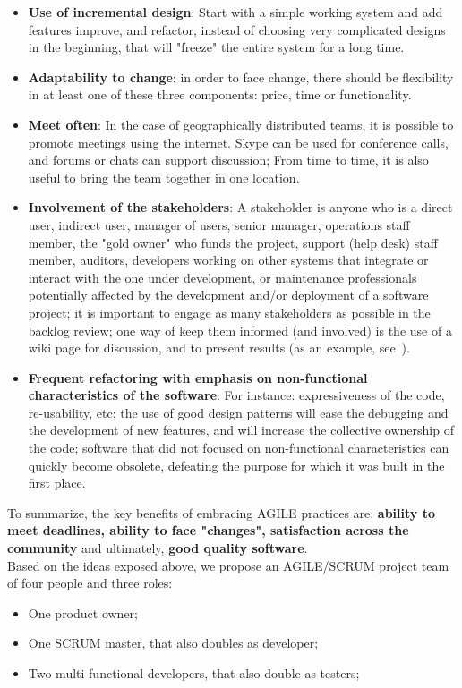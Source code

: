 \documentclass[11pt]{article} %
\begin{document}
\begin{itemize}
\item \textbf{Use of incremental design}: Start with a simple working system and add features improve, and refactor, instead of choosing very complicated designs in the beginning, that will "freeze" the entire system for a long time.
\item \textbf{Adaptability to change}: in order to face change, there should be flexibility in at least one of these three components: price, time or functionality.
\item \textbf{Meet often}: In the case of geographically distributed teams, it is possible to promote meetings using the internet. Skype can be used for conference calls, and forums or chats can support discussion; From time to time, it is also useful to bring the team together in one location.
\item \textbf{Involvement of the stakeholders}: A stakeholder is anyone who is a direct user, indirect user, manager of users, senior manager, operations staff member, the "gold owner" who funds the project, support (help desk) staff member, auditors, developers working on other systems that integrate or interact with the one under development, or maintenance professionals potentially affected by the development and/or deployment of a software project; it is important to engage as many stakeholders as possible in the backlog review; one way of keep them informed (and involved) is the use of a wiki page for discussion, and to present results (as an example, see~\cite{ladybug}).
\item \textbf{Frequent refactoring with emphasis on non-functional characteristics of the software}: For instance: expressiveness of the code, re-usability, etc; the use of good design patterns will ease the debugging and the development of new features, and will increase the collective ownership of the code; software that did not focused on non-functional characteristics can quickly become obsolete, defeating the purpose for which it was built in the first place.
\end{itemize}    
To summarize, the key benefits of embracing AGILE practices are: \textbf{ability to meet deadlines, ability to face "changes", satisfaction across the community} and ultimately, \textbf{good quality software}.\\
Based on the ideas exposed above, we propose an AGILE/SCRUM project team of four people and three roles:
\begin{itemize}
\item One product owner;
\item One SCRUM master, that also doubles as developer;
\item Two multi-functional developers, that also double as testers;
\end{itemize}
\end{document}
